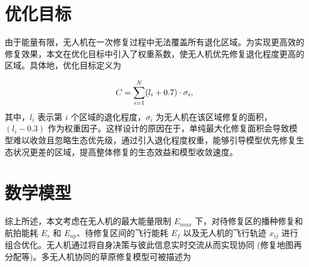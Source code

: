 \documentclass[AutoFakeBold]{LZUThesis}
\begin{document}
\section{优化目标}

由于能量有限，无人机在一次修复过程中无法覆盖所有退化区域。为实现更高效的修复效果，本文在优化目标中引入了权重系数，使无人机优先修复退化程度更高的区域。具体地，优化目标定义为

\begin{equation} \label{maximize-weighted-sum}
	\begin{small}
		C = \sum_{i=1}^{N} (l_i + 0.7) \cdot \sigma_i,
	\end{small}
\end{equation}
其中，$l_i$ 表示第 $i$ 个区域的退化程度，$\sigma_i$ 为无人机在该区域修复的面积，$(l_i - 0.3)$ 作为权重因子。这样设计的原因在于，单纯最大化修复面积会导致模型难以收敛且忽略生态优先级，通过引入退化程度权重，能够引导模型优先修复生态状况更差的区域，提高整体修复的生态效益和模型收敛速度。

\section{数学模型}

综上所述，本文考虑在无人机的最大能量限制 $E_{max}$ 下，对待修复区的播种修复和航拍能耗 $E_s$ 和 $E_{ap}$、待修复区间的飞行能耗 $E_f$ 以及无人机的飞行轨迹 $x_{ij}$ 进行组合优化。无人机通过将自身决策与彼此信息实时交流从而实现协同 (修复地图再分配等)。多无人机协同的草原修复模型可被描述为
\end{document}
